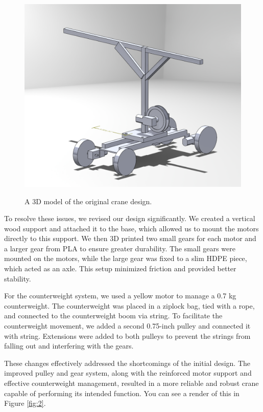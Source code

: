 \documentclass[letterpaper, 12pt]{article}
\begin{document}
\begin{figure}[H]
    \centering
    \includegraphics[width = \textwidth]{Crane_render_1.png}
    \label{fig:1}
    \caption{A 3D model of the original crane design.}
\end{figure}

To resolve these issues, we revised our design significantly. We created a vertical wood support and attached it to the base, which allowed us to mount the motors directly to this support. We then 3D printed two small gears for each motor and a larger gear from PLA to ensure greater durability. The small gears were mounted on the motors, while the large gear was fixed to a slim HDPE piece, which acted as an axle. This setup minimized friction and provided better stability.

For the counterweight system, we used a yellow motor to manage a 0.7 kg counterweight. The counterweight was placed in a ziplock bag, tied with a rope, and connected to the counterweight boom via string. To facilitate the counterweight movement, we added a second 0.75-inch pulley and connected it with string. Extensions were added to both pulleys to prevent the strings from falling out and interfering with the gears.

These changes effectively addressed the shortcomings of the initial design. The improved pulley and gear system, along with the reinforced motor support and effective counterweight management, resulted in a more reliable and robust crane capable of performing its intended function. You can see a render of this in Figure \ref{fig:2}.
\end{document}
